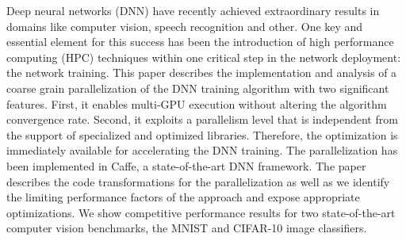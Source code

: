Deep neural networks (DNN) have recently achieved extraordinary
results in domains like computer vision, speech recognition and
other. One key and essential element for this success
has been the introduction of high performance computing (HPC)
techniques within one critical step in the network deployment: the
network training. This paper describes the implementation and
analysis of a coarse grain parallelization of the DNN training algorithm
with two significant features. First, it enables multi-GPU
execution without altering the algorithm convergence rate. Second,
it exploits a parallelism level that is independent from the support
of specialized and optimized libraries. Therefore, the optimization
is immediately available for accelerating the DNN training. The parallelization
has been implemented in Caffe, a state-of-the-art DNN framework. The paper
describes the code transformations for the parallelization as well as
we identify the limiting performance factors of the approach and expose
appropriate optimizations. We show competitive performance
results for two state-of-the-art computer vision benchmarks, the
MNIST and CIFAR-10 image classifiers.
